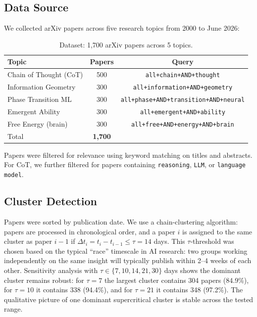 \documentclass[12pt]{article}
\begin{document}
\subsection{Data Source}

We collected arXiv papers across five research topics from 2000 to June 2026:

\begin{table}[htbp]
  \centering
  \begin{tabular}{lcc}
    \toprule
    Topic & Papers & Query \\
    \midrule
    Chain of Thought (CoT) & 500 & \texttt{all+chain+AND+thought} \\
    Information Geometry & 300 & \texttt{all+information+AND+geometry} \\
    Phase Transition ML & 300 & \texttt{all+phase+AND+transition+AND+neural} \\
    Emergent Ability & 300 & \texttt{all+emergent+AND+ability} \\
    Free Energy (brain) & 300 & \texttt{all+free+AND+energy+AND+brain} \\
    \midrule
    Total & \textbf{1,700} & \\
    \bottomrule
  \end{tabular}
  \caption{Dataset: 1,700 arXiv papers across 5 topics.}
  \label{tab:dataset}
\end{table}

Papers were filtered for relevance using keyword matching on titles and abstracts. For CoT, we further filtered for papers containing \texttt{reasoning}, \texttt{LLM}, or \texttt{language model}.

\subsection{Cluster Detection}
\label{subsec:cluster}

Papers were sorted by publication date. We use a chain-clustering algorithm: papers are processed in chronological order, and a paper $i$ is assigned to the same cluster as paper $i-1$ if $\Delta t_i = t_i - t_{i-1} \leq \tau = 14$ days. This $\tau$-threshold was chosen based on the typical ``race'' timescale in AI research: two groups working independently on the same insight will typically publish within 2--4 weeks of each other. Sensitivity analysis with $\tau \in \{7, 10, 14, 21, 30\}$ days shows the dominant cluster remains robust: for $\tau=7$ the largest cluster contains 304 papers (84.9\%), for $\tau=10$ it contains 338 (94.4\%), and for $\tau=21$ it contains 348 (97.2\%). The qualitative picture of one dominant supercritical cluster is stable across the tested range.
\end{document}
